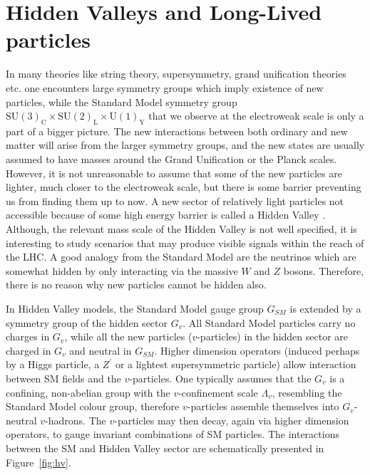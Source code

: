 \section{Hidden Valleys and Long-Lived particles}

In many theories like string theory, supersymmetry, grand unification theories etc.
 one encounters large symmetry groups which imply existence of
new particles, while the Standard Model symmetry group $\text{SU}(3)_\text{C} \times \text{SU}(2)_\text{L} \times \text{U}(1)_\text{Y}$ 
 that we observe at the electroweak scale is only a part of a bigger picture.
The new interactions between
both ordinary and new matter will arise from the larger symmetry groups,  and  
the new states are usually
assumed to have masses around the Grand Unification or the Planck scales. However, it is not unreasonable
to assume that some of the new particles are lighter, much closer to the electroweak scale,
but there is some barrier preventing us from finding them up to now. A new sector
of relatively light particles not accessible because of some high energy barrier is called 
a Hidden Valley \cite{Strassler:2006im,Strassler:2006qa}.
Although, the relevant mass scale of the Hidden Valley is not well
specified, it is interesting to study scenarios that may produce visible signals within 
the reach of the LHC.
A good analogy from the Standard Model are 
the neutrinos which are somewhat hidden by only interacting via the massive $W$ and $Z$ bosons.
Therefore, there is no reason why new particles cannot be hidden also. 

In Hidden Valley models, the Standard Model gauge group $G_{SM}$ is extended by a symmetry 
group of the hidden sector $G_v$. 
All Standard Model particles carry no charges in $G_v$, while
all the new particles ($v$-particles) in the hidden sector are charged in $G_v$ and neutral 
in $G_{SM}$. Higher dimension operators (induced perhaps by a Higgs particle, a $Z^{'}$ or
a lightest supersymmetric particle) allow interaction between SM
fields and the $v$-particles.
One typically assumes that the $G_v$ is a confining, non-abelian group with the
$v$-confinement scale $\Lambda_v$, resembling the Standard Model colour group,
therefore $v$-particles assemble themselves into $G_v$-neutral $v$-hadrons.
The $v$-particles may then decay, again via higher dimension operators, to gauge invariant 
combinations of SM particles. The interactions between the SM and Hidden Valley sector are
schematically presented in Figure~\ref{fig:hv}. 


